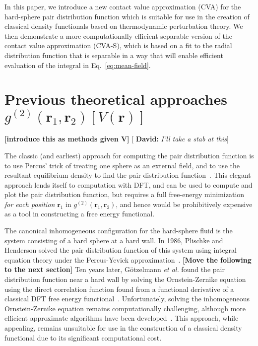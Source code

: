 \documentclass[letterpaper,twocolumn,amsmath,amssymb,pre,aps,10pt]{revtex4-1}
\newcommand{\red}[1]{{\bf \color{red} #1}}
\newcommand{\green}[1]{{\bf \color{green} #1}}
\newcommand{\rr}{\textbf{r}}
\newcommand{\fixme}[1]{\red{[#1]}}
\newcommand{\davidsays}[1]{{\color{red} [\green{David:} \emph{#1}]}}
\begin{document}
In this paper, we introduce a new contact value approximation (CVA) for
the hard-sphere pair distribution function which is suitable for use
in the creation of classical density functionals based on
thermodynamic perturbation theory. We then demonstrate a more
computationally efficient separable version of the contact
value approximation (CVA-S), which is based on a fit to the radial
distribution function that is separable in a way that will enable
efficient evaluation of the integral in Eq.~\ref{eq:mean-field}.

\section{Previous theoretical approaches $g^{(2)}(\rr_1,\rr_2)[V(\rr)]$}\label{sec:gV}

\fixme{introduce this as methods given V}\davidsays{I'll take a stab
  at this}

The classic (and earliest) approach for computing the pair
distribution function is to use Percus' trick of treating one sphere
as an external field, and to use the resultant equilibrium density to
find the pair distribution function~\cite{hansen2006theory}.  This
elegant approach lends itself to computation with DFT, and can be used to compute and
plot the pair distribution function, but requires a full free-energy
minimization \emph{for each position} $\rr_1$ in
$g^{(2)}(\rr_1,\rr_2)$, and hence would be prohibitively expensive as
a tool in constructing a free energy functional.

The canonical inhomogeneous configuration for the hard-sphere fluid is
the system consisting of a hard sphere at a hard wall.  In 1986,
Plischke and Henderson solved the pair distribution function of this
system using integral equation theory under the Percus-Yevick
approximation~\cite{plischke1986pair}.  \fixme{Move the following to
  the next section} Ten years later,
G{\"o}tzelmann \emph{et al.} found the pair distribution function near
a hard wall by solving the Ornstein-Zernike equation using the direct
correlation function found from a functional derivative of a classical
DFT free energy functional~\cite{gotzelmann1996structure}.
Unfortunately, solving the inhomogeneous Ornstein-Zernike equation
remains computationally challenging, although more efficient
approximate algorithms have been developed~\cite{paul2003variational}.
This approach, while appealing, remains unsuitable for use in the
construction of a classical density functional due to its significant
computational cost.
\end{document}
